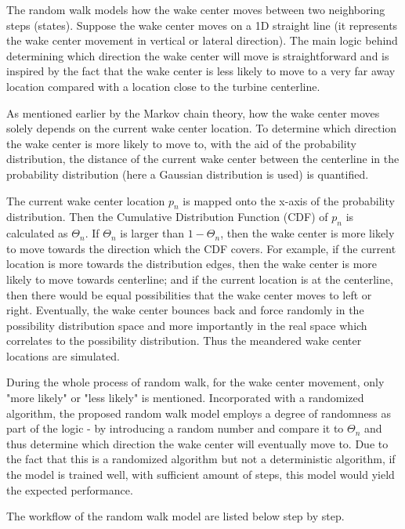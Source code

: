 \documentclass{umthesis}
\begin{document}
The random walk models how the wake center moves between two neighboring steps (states). Suppose the wake center moves on a 1D straight line (it represents the wake center movement in vertical or lateral direction). The main logic behind determining which direction the wake center will move is straightforward and is inspired by the fact that the wake center is less likely to move to a very far away location compared with a location close to the turbine centerline.

As mentioned earlier by the Markov chain theory, how the wake center moves solely depends on the current wake center location. To determine which direction the wake center is more likely to move to, with the aid of the probability distribution, the distance of the current wake center between the centerline in the probability distribution (here a Gaussian distribution is used) is quantified. 

The current wake center location $p_n$ is mapped onto the x-axis of the probability distribution. Then the Cumulative Distribution Function (CDF) of $p_n$ is calculated as $\Theta_n$. If $\Theta_n$ is larger than $1-\Theta_n$, then the wake center is more likely to move towards the direction which the CDF covers. For example, if the current location is more towards the distribution edges, then the wake center is more likely to move towards centerline; and if the current location is at the centerline, then there would be equal possibilities that the wake center moves to left or right. Eventually, the wake center bounces back and force randomly in the possibility distribution space and more importantly in the real space which correlates to the possibility distribution. Thus the meandered wake center locations are simulated.

During the whole process of random walk, for the wake center movement, only "more likely" or "less likely" is mentioned. Incorporated with a randomized algorithm, the proposed random walk model employs a degree of randomness as part of the logic - by introducing a random number and compare it to $\Theta_n$ and thus determine which direction the wake center will eventually move to. Due to the fact that this is a randomized algorithm but not a deterministic algorithm, if the model is trained well, with sufficient amount of steps, this model would yield the expected performance.

The workflow of the random walk model are listed below step by step.
\end{document}
